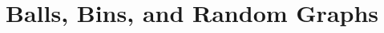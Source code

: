 \documentclass[main.tex]{subfiles}
\begin{document}
\minispacing

\section{Balls, Bins, and Random Graphs}
\end{document}
